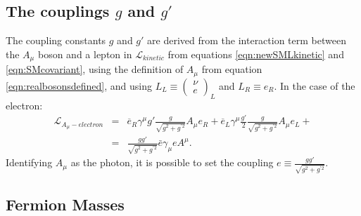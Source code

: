 \subsection{The couplings $g$ and $g'$}

The coupling constants $g$ and $g'$ are derived from the interaction term between the $A_\mu$ boson and a lepton in $\mathcal L_{kinetic}$ from equations \ref{eqn:newSMLkinetic} and \ref{eqn:SMcovariant}, using the definition of $A_\mu$ from equation \ref{eqn:realbosonsdefined}, and using $L_L \equiv \left( \begin{array}{cc} \nu \\ e \end{array}\right)_L$ and $L_R \equiv e_R$. In the case of the electron:
\begin{eqnarray}

\mathcal L_{A_\mu-electron} &=&  \overline{e}_R\gamma^\mu g' \frac{g}{\sqrt{g^2 + g^{'2}}} A_\mu e_R + \overline{e}_L\gamma^\mu \frac{g'}{2} \frac{g}{\sqrt{g^2 + g^{'2}}} A_\mu e_L + \nonumber \\
&=&  \frac{gg'}{\sqrt{g^2 + g^{'2}}}\bar{e}\gamma_\mu e A^\mu .
\label{eqn:ALinteraction}
\end{eqnarray}
Identifying $A_\mu$ as the photon, it is possible to set the coupling $ e \equiv \frac{gg'}{\sqrt{g^2 + g^{'2}}}$. 

\subsection{Fermion Masses}
\label{section:fermionmasses}


